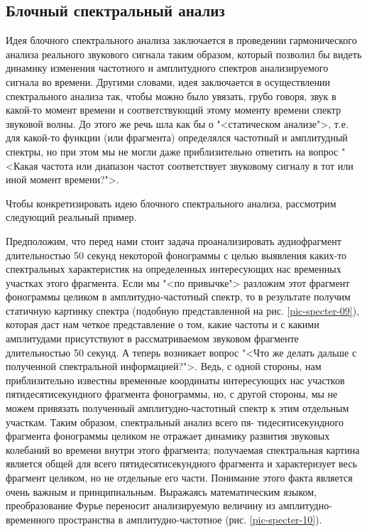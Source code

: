 \documentclass[oneside, final, 14pt]{extreport}
\begin{document}
\subsection{Блочный спектральный анализ}
Идея блочного спектрального анализа заключается в проведении гармонического анализа реального звукового сигнала таким образом, который позволил бы видеть динамику изменения частотного и амплитудного спектров анализируемого сигнала во времени. Другими словами, идея заключается в осуществлении спектрального анализа так, чтобы можно было увязать, грубо говоря, звук в какой-то момент времени и соответствующий этому моменту времени спектр звуковой волны. До этого же речь шла как бы о "<статическом анализе">, т.е. для какой-то функции (или фрагмента) определялся частотный и амплитудный спектры, но при этом мы не могли даже приблизительно ответить на вопрос "<Какая частота или диапазон частот соответствует звуковому сигналу в тот или иной момент времени?">.

Чтобы конкретизировать идею блочного спектрального анализа, рассмотрим следующий реальный пример.

Предположим, что перед нами стоит задача проанализировать аудиофрагмент длительностью 50 секунд некоторой фонограммы с целью выявления каких-то спектральных характеристик на определенных интересующих нас временных участках этого фрагмента. Если мы "<по привычке"> разложим этот фрагмент фонограммы целиком в амплитудно-частотный спектр, то в результате получим статичную картинку спектра (подобную представленной на рис. \ref{pic-specter-09}), которая даст нам четкое представление о том, какие частоты и с какими амплитудами присутствуют в рассматриваемом звуковом фрагменте длительностью 50 секунд. А теперь возникает вопрос "<Что же делать дальше с полученной спектральной информацией?">.
Ведь, с одной стороны, нам приблизительно известны временные координаты интересующих нас участков пятидесятисекундного фрагмента фонограммы, но, с другой стороны, мы не можем привязать полученный амплитудно-частотный спектр к этим отдельным участкам. Таким образом, спектральный анализ всего пя-
тидесятисекундного фрагмента фонограммы целиком не отражает динамику развития звуковых колебаний во времени внутри этого фрагмента; получаемая спектральная картина является общей для всего пятидесятисекундного фрагмента и характеризует весь фрагмент целиком, но не отдельные его части. Понимание этого факта является очень важным и принципиальным. Выражаясь математическим
языком, преобразование Фурье переносит анализируемую величину из амплитудно-временного пространства в амплитудно-частотное (рис. \ref{pic-specter-10}).
\end{document}
